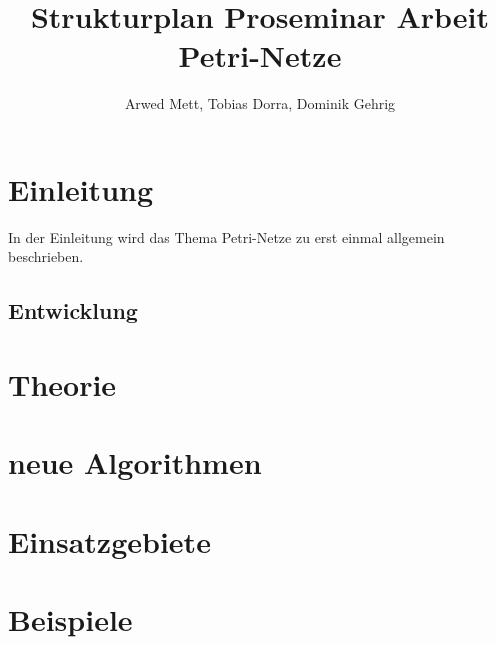 \documentclass{article}
\author{Arwed Mett, Tobias Dorra, Dominik Gehrig}
\title{Strukturplan Proseminar Arbeit Petri-Netze}
\begin{document}
\maketitle

\section{Einleitung}
In der Einleitung wird das Thema Petri-Netze zu erst einmal allgemein beschrieben.

\subsection{Entwicklung}

\section{Theorie}

\section{neue Algorithmen}

\section{Einsatzgebiete}

\section{Beispiele}
\end{document}
